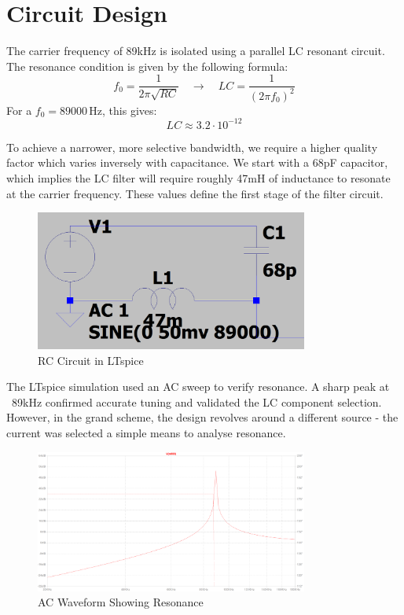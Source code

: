 \section{Circuit Design}

The carrier frequency of 89kHz is isolated using a parallel LC resonant circuit. The resonance condition is given by the following formula:
\[
    f_0 = \frac{1}{2\pi\sqrt{RC}} \quad \rightarrow \quad LC = \frac{1}{(2\pi f_0)^2}
\]
For a \( f_0 = 89000\,\text{Hz} \), this gives:
\[
    LC \approx 3.2 \cdot 10^{-12}
\]

To achieve a narrower, more selective bandwidth, we require a higher quality factor which varies inversely with capacitance. We start with a 68pF capacitor, which implies the LC filter will require roughly 47mH of inductance to resonate at the carrier frequency. These values define the first stage of the filter circuit.
\begin{figure}[H]
    \centering
    \includegraphics[width=0.8\textwidth]{subpages/images/radio_LTspice_rc_circuit.png}
    \caption{RC Circuit in LTspice}
    \label{fig:rc_circuit}
\end{figure}

The LTspice simulation used an AC sweep to verify resonance. A sharp peak at ~89kHz confirmed accurate tuning and validated the LC component selection. However, in the grand scheme, the design revolves around a different source - the current was selected a simple means to analyse resonance.
\begin{figure}[H]
    \centering
    \includegraphics[width=0.8\textwidth]{subpages/images/radio_ac_waveform.png}
    \caption{AC Waveform Showing Resonance}
    \label{fig:ac_waveform}
\end{figure}

